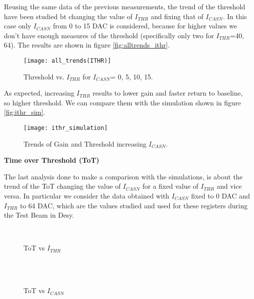 Reusing the same data of the previous measurements, the trend of the threshold have been studied bt changing the value of $I_{THR}$ and fixing that of $I_{CASN}$. In this case only $I_{CASN}$ from 0 to 15 DAC is considered, because for higher values we don't have enough measures of the threshold (specifically only two for $I_{THR}$=40, 64). The results are shown in figure \vref{fig:alltrends_ithr}.

\begin{figure}[h!]
\centering
\texttt{[image: all\_trends(ITHR)]}
\caption{Threshold vs. $I_{THR}$ for $I_{CASN}$= 0, 5, 10, 15.}
\label{fig:alltrends_ithr}
\end{figure}

As expected, increasing $I_{THR}$ results to lower gain and faster return to baseline, so higher threshold. 
We can compare them with the simulation shown in figure \vref{fig:ithr_sim}. 

\begin{figure}[h!]
\centering
\texttt{[image: ithr\_simulation]}
\caption{Trends of Gain and Threshold increasing $I_{CASN}$.}
\label{fig:ithr_sim}
\end{figure}

\begin{description}
\item[\textbf{Time over Threshold (ToT)}]
\end{description}

The last analysis done to make a comparison with the simulations, is about the trend of the ToT changing the value of $I_{CASN}$ for a fixed value of $I_{THR}$ and vice versa. In particular we consider the data obtained with $I_{CASN}$ fixed to 0 DAC and $I_{THR}$ to 64 DAC, which are the values studied and used for these registers during the Test Beam in Desy.

\begin{figure}[h!]
\centering
{}\quad
{}\\
\caption{ToT vs $I_{THR}$}
\label{fig:tot_vs_ithr}
\end{figure}

\begin{figure}[h!]
\centering
{}\\%
{}\\
\caption{ToT vs $I_{CASN}$}
\label{fig:tot_vs_icasn}
\end{figure}

